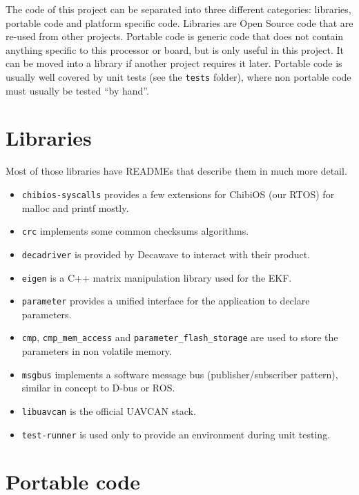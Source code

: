 The code of this project can be separated into three different
categories: libraries, portable code and platform specific code.
Libraries are Open Source code that are re-used from other projects.
Portable code is generic code that does not contain anything specific to
this processor or board, but is only useful in this project. It can be
moved into a library if another project requires it later. Portable code
is usually well covered by unit tests (see the \texttt{tests} folder),
where non portable code must usually be tested ``by hand''.

\section*{Libraries}\label{libraries}

Most of those libraries have READMEs that describe them in much more
detail.

\begin{itemize}
\tightlist
\item
  \texttt{chibios-syscalls} provides a few extensions for ChibiOS (our
  RTOS) for malloc and printf mostly.
\item
  \texttt{crc} implements some common checksums algorithms.
\item
  \texttt{decadriver} is provided by Decawave to interact with their
  product.
\item
  \texttt{eigen} is a C++ matrix manipulation library used for the EKF.
\item
  \texttt{parameter} provides a unified interface for the application to
  declare parameters.
\item
  \texttt{cmp}, \texttt{cmp\_mem\_access} and
  \texttt{parameter\_flash\_storage} are used to store the parameters in
  non volatile memory.
\item
  \texttt{msgbus} implements a software message bus
  (publisher/subscriber pattern), similar in concept to D-bus or ROS.
\item
  \texttt{libuavcan} is the official UAVCAN stack.
\item
  \texttt{test-runner} is used only to provide an environment during
  unit testing.
\end{itemize}

\section*{Portable code}\label{portable-code}

